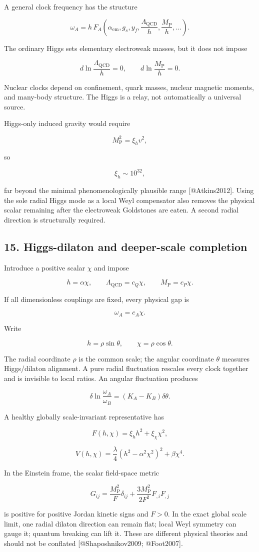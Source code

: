 \documentclass[
]{article}
\begin{document}
A general clock frequency has the structure

\[
\omega_A
=h\,F_A\left(
\alpha_{\mathrm{em}},g_s,y_f,
\frac{\Lambda_{\mathrm{QCD}}}h,
\frac{M_{\mathrm{P}}}h,\ldots
\right).
\]

The ordinary Higgs sets elementary electroweak masses, but it does not
impose

\[
d\ln\frac{\Lambda_{\mathrm{QCD}}}h=0,
\qquad
d\ln\frac{M_{\mathrm{P}}}h=0.
\]

Nuclear clocks depend on confinement, quark masses, nuclear magnetic
moments, and many-body structure. The Higgs is a relay, not
automatically a universal source.

Higgs-only induced gravity would require

\[
M_{\mathrm{P}}^2=\xi_hv^2,
\]

so

\[
\xi_h\sim10^{32},
\]

far beyond the minimal phenomenologically plausible range
{[}@Atkins2012{]}. Using the sole radial Higgs mode as a local Weyl
compensator also removes the physical scalar remaining after the
electroweak Goldstones are eaten. A second radial direction is
structurally required.

\hypertarget{higgs-dilaton-and-deeper-scale-completion}{%
\subsection{15. Higgs-dilaton and deeper-scale
completion}\label{higgs-dilaton-and-deeper-scale-completion}}

Introduce a positive scalar \(\chi\) and impose

\[
\boxed{
h=\alpha\chi,
\qquad
\Lambda_{\mathrm{QCD}}=c_Q\chi,
\qquad
M_{\mathrm{P}}=c_P\chi.
}
\]

If all dimensionless couplings are fixed, every physical gap is

\[
\omega_A=c_A\chi.
\]

Write

\[
h=\rho\sin\theta,
\qquad
\chi=\rho\cos\theta.
\]

The radial coordinate \(\rho\) is the common scale; the angular
coordinate \(\theta\) measures Higgs/dilaton alignment. A pure radial
fluctuation rescales every clock together and is invisible to local
ratios. An angular fluctuation produces

\[
\delta\ln\frac{\omega_A}{\omega_B}
=(K_A-K_B)\delta\theta.
\]

A healthy globally scale-invariant representative has

\[
F(h,\chi)=\xi_hh^2+\xi_\chi\chi^2,
\]

\[
V(h,\chi)=\frac\lambda4(h^2-\alpha^2\chi^2)^2+\beta\chi^4.
\]

In the Einstein frame, the scalar field-space metric

\[
G_{ij}=\frac{M_{\mathrm{P}}^2}{F}\delta_{ij}
+\frac{3M_{\mathrm{P}}^2}{2F^2}F_{,i}F_{,j}
\]

is positive for positive Jordan kinetic signs and \(F>0\). In the exact
global scale limit, one radial dilaton direction can remain flat; local
Weyl symmetry can gauge it; quantum breaking can lift it. These are
different physical theories and should not be conflated
{[}@Shaposhnikov2009; @Foot2007{]}.
\end{document}
